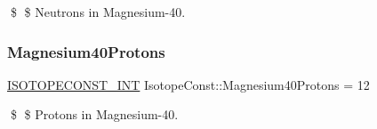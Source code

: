 \$ \$ Neutrons in Magnesium-\/40. \mbox{\label{group___isotope_const-_magnesium-_mg40_ga9247fa3c9c0808ddf49b91603bd6684b}} 
\subsubsection{\texorpdfstring{Magnesium40\+Protons}{Magnesium40Protons}}
{\footnotesize\ttfamily \mbox{\hyperlink{group___isotope_const-_macros_ga5f18360b3e99483a35c32d789e62621c}{I\+S\+O\+T\+O\+P\+E\+C\+O\+N\+S\+T\+\_\+\+I\+NT}} Isotope\+Const\+::\+Magnesium40\+Protons = 12}

\$ \$ Protons in Magnesium-\/40. 